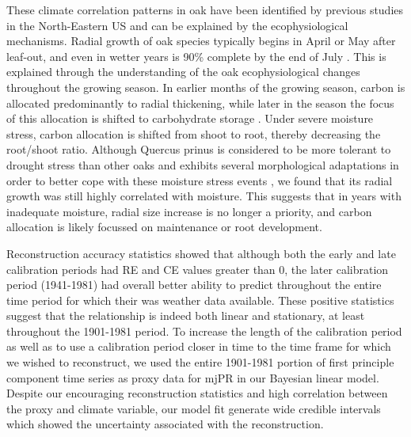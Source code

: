 \documentclass[11pt]{article}
\begin{document}
These climate correlation patterns in oak have been identified by previous studies in the North-Eastern US \cite{speer2009climate, li2011dendroclimatic} and can be explained by the ecophysiological mechanisms. 
Radial growth of oak species typically begins in April or May after leaf-out, and even in wetter years is 90\% complete by the end of July \cite{robertson1992factors}. This is explained through the understanding of the oak ecophysiological changes throughout the growing season. In earlier months of the growing season, carbon is allocated predominantly to radial thickening, while later in the season the focus of this allocation is shifted to carbohydrate storage \cite{zweifel2006intra}. Under severe moisture stress, carbon allocation is shifted from shoot to root, thereby decreasing the root/shoot ratio. Although Quercus prinus is considered to be more tolerant to drought stress than other oaks and exhibits several morphological adaptations in order to better cope with these moisture stress events \cite{dickson1996oak}, we found that its radial growth was still highly correlated with moisture. This suggests that in years with inadequate moisture, radial size increase is no longer a priority, and carbon allocation is likely focussed on maintenance or root development.

Reconstruction accuracy statistics showed that although both the early and late calibration periods had RE and CE values greater than 0, the later calibration period (1941-1981) had overall better ability to predict throughout the entire time period for which their was weather data available. These positive statistics suggest that the relationship is indeed both linear and stationary, at least throughout the 1901-1981 period. To increase the length of the calibration period as well as to use a calibration period closer in time to the time frame for which we wished to reconstruct, we used the entire 1901-1981 portion of first principle component time series as proxy data for mjPR in our Bayesian linear model. Despite our encouraging reconstruction statistics and high correlation between the proxy and climate variable, our model fit generate wide credible intervals which showed the uncertainty associated with the reconstruction. 
\end{document}
